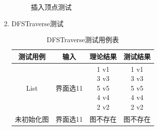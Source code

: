 \documentclass[supercite]{HustGraduPaper}
\theoremstyle{definition}
\begin{document}
\begin{enumerate}
\begin{figure}[htb]
		      \caption{插入顶点测试}
	      \end{figure}
	      \newpage
	\item DFSTraverse测试
	      \begin{table}[htb]
		      \begin{center}
			      \setlength{\tabcolsep}{2.0mm}
			      \caption{DFSTraverse测试用例表}
			      \label{t11}
			      \begin{tabular}{|c|c|c|c|}
				      \hline
				      测试用例   & 输入     & 理论结果          & 测试结果 \\
				      \hline
				      \hline
				      List       & 界面选11 & \makecell[c]{1 v1            \\3 v3\\5 v5\\4 v4\\2 v2}   & \makecell[c]{1 v1\\3 v3\\5 v5\\4 v4\\2 v2} \\
				      \hline
				      未初始化图 & 界面选11 & 图不存在          & 图不存在 \\
				      \hline
			      \end{tabular}
		      \end{center}
	      \end{table}
	      \begin{figure}[htb]
		      \centering
		      \quad
		      \\

\end{figure}
\end{enumerate}
\end{document}
